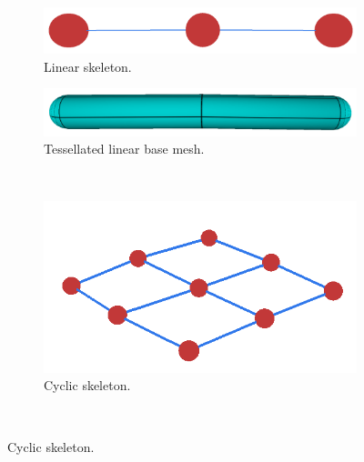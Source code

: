 \begin{figure}[h]
        \centering
        \begin{subfigure}[b]{0.4\textwidth}
        	\centering
                \includegraphics[width=\textwidth]{images/cerv_skl.png}
                \caption{Linear skeleton.}
                \label{fig:lin_skl}
        \end{subfigure}%
        \qquad %
        \begin{subfigure}[b]{0.4\textwidth}
        	\centering
                \includegraphics[width=\textwidth]{images/cerv_mesh.png}
                \caption{Tessellated linear base mesh.}
                \label{fig:lin_mesh}
        \end{subfigure}%
        \\ %
        \begin{subfigure}[b]{0.5\textwidth}
        	\centering
                \includegraphics[width=\textwidth]{images/cycle_skl.png}
                \caption{Cyclic skeleton.}
                \label{fig:cyclic_skl}
        \end{subfigure}%
        ~ %

\end{figure}
